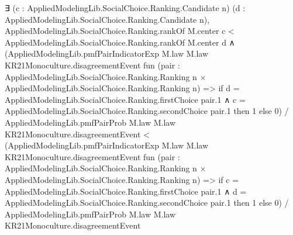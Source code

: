 \documentclass[10pt]{article}
\begin{document}
\begin{ReviewVerbatim}
                ∃ (c : AppliedModelingLib.SocialChoice.Ranking.Candidate n) (d :
                  AppliedModelingLib.SocialChoice.Ranking.Candidate n),
                  AppliedModelingLib.SocialChoice.Ranking.rankOf M.center c <
                      AppliedModelingLib.SocialChoice.Ranking.rankOf M.center d ∧
                    (AppliedModelingLib.pmfPairIndicatorExp M.law M.law KR21Monoculture.disagreementEvent
                          fun
                            (pair :
                              AppliedModelingLib.SocialChoice.Ranking.Ranking n ×
                                AppliedModelingLib.SocialChoice.Ranking.Ranking n) =>
                          if
                              d = AppliedModelingLib.SocialChoice.Ranking.firstChoice pair.1 ∧
                                c = AppliedModelingLib.SocialChoice.Ranking.secondChoice pair.1 then
                            1
                          else 0) /
                        AppliedModelingLib.pmfPairProb M.law M.law KR21Monoculture.disagreementEvent <
                      (AppliedModelingLib.pmfPairIndicatorExp M.law M.law KR21Monoculture.disagreementEvent
                          fun
                            (pair :
                              AppliedModelingLib.SocialChoice.Ranking.Ranking n ×
                                AppliedModelingLib.SocialChoice.Ranking.Ranking n) =>
                          if
                              c = AppliedModelingLib.SocialChoice.Ranking.firstChoice pair.1 ∧
                                d = AppliedModelingLib.SocialChoice.Ranking.secondChoice pair.1 then
                            1
                          else 0) /
                        AppliedModelingLib.pmfPairProb M.law M.law KR21Monoculture.disagreementEvent
\end{ReviewVerbatim}
\end{document}
